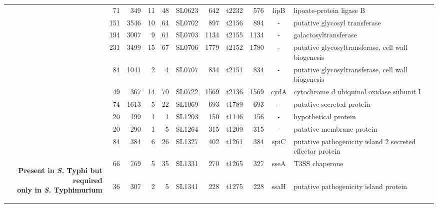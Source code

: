 \begin{landscape}
\begin{longtable}{ r
    				r
				r
				r
				r
				l
				r
				r
				r
				c
				p{1.8in}}
   & 71    & 349   & 11    & 48    & SL0623 & 642   & t2232 & 576   & lipB  & lipoate-protein ligase B \\
   & 151   & 3546  & 10    & 64    & SL0702 & 897   & t2156 & 894   & -     & putative glycosyl transferase \\
   & 194   & 3007  & 9     & 61    & SL0703 & 1134  & t2155 & 1134  & -     & galactosyltransferase \\
   & 231   & 3499  & 15    & 67    & SL0706 & 1779  & t2152 & 1780  & -     & putative glycosyltransferase, cell wall biogenesis \\
   & 84    & 1041  & 2     & 4     & SL0707 & 834   & t2151 & 834   & -     & putative glycosyltransferase, cell wall biogenesis \\
   & 49    & 367   & 14    & 70    & SL0722 & 1569  & t2136 & 1569  & cydA  & cytochrome d ubiquinol oxidase subunit I \\
   &\cellcolor{Gray}74    &\cellcolor{Gray}1613  &\cellcolor{Gray}5     &\cellcolor{Gray}22    &\cellcolor{Gray}SL1069 &\cellcolor{Gray}693   &\cellcolor{Gray}t1789 &\cellcolor{Gray}693   &\cellcolor{Gray}-     &\cellcolor{Gray}putative secreted protein \\
   & 20    & 199   & 1     & 1     & SL1203 & 150   & t1146 & 156   & -     & hypothetical protein \\
   & 20    & 290   & 1     & 5     & SL1264 & 315   & t1209 & 315   & -     & putative membrane protein \\
   &\cellcolor{Gray}84    &\cellcolor{Gray}384   &\cellcolor{Gray}6     &\cellcolor{Gray}26    &\cellcolor{Gray}SL1327 &\cellcolor{Gray}402   &\cellcolor{Gray}t1261 &\cellcolor{Gray}384   &\cellcolor{Gray}spiC  &\cellcolor{Gray}putative pathogenicity island 2 secreted effector protein \\
    \multirow{25}{*}{\begin{sideways}\parbox{3in}{\centering\textbf{Present in \textit{S.} Typhi but required \\only in \textit{S.} Typhimurium}}\end{sideways}}&\cellcolor{Gray}66    &\cellcolor{Gray}769   &\cellcolor{Gray}5     &\cellcolor{Gray}35    &\cellcolor{Gray}SL1331 &\cellcolor{Gray}270   &\cellcolor{Gray}t1265 &\cellcolor{Gray}327   &\cellcolor{Gray}sseA  & \cellcolor{Gray}T3SS chaperone \\
   &\cellcolor{Gray}36    &\cellcolor{Gray}307   &\cellcolor{Gray}2     &\cellcolor{Gray}5     &\cellcolor{Gray}SL1341 &\cellcolor{Gray}228   & \cellcolor{Gray}t1275 &\cellcolor{Gray}228   &\cellcolor{Gray}ssaH  &\cellcolor{Gray}putative pathogenicity island protein \\

\end{longtable}
\end{landscape}
